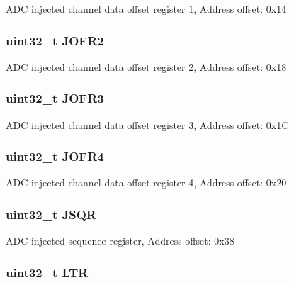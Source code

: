 A\-D\-C injected channel data offset register 1, Address offset\-: 0x14 \hypertarget{struct_a_d_c___type_def_a11e65074b9f06b48c17cdfa5bea9f125}{
\subsubsection[{J\-O\-F\-R2}]{ uint32\-\_\-t J\-O\-F\-R2}}\label{struct_a_d_c___type_def_a11e65074b9f06b48c17cdfa5bea9f125}
A\-D\-C injected channel data offset register 2, Address offset\-: 0x18 \hypertarget{struct_a_d_c___type_def_a613f6b76d20c1a513976b920ecd7f4f8}{
\subsubsection[{J\-O\-F\-R3}]{ uint32\-\_\-t J\-O\-F\-R3}}\label{struct_a_d_c___type_def_a613f6b76d20c1a513976b920ecd7f4f8}
A\-D\-C injected channel data offset register 3, Address offset\-: 0x1\-C \hypertarget{struct_a_d_c___type_def_a2fd59854223e38158b4138ee8e913ab3}{
\subsubsection[{J\-O\-F\-R4}]{ uint32\-\_\-t J\-O\-F\-R4}}\label{struct_a_d_c___type_def_a2fd59854223e38158b4138ee8e913ab3}
A\-D\-C injected channel data offset register 4, Address offset\-: 0x20 \hypertarget{struct_a_d_c___type_def_a75e0cc079831adcc051df456737d3ae4}{
\subsubsection[{J\-S\-Q\-R}]{ uint32\-\_\-t J\-S\-Q\-R}}\label{struct_a_d_c___type_def_a75e0cc079831adcc051df456737d3ae4}
A\-D\-C injected sequence register, Address offset\-: 0x38 \hypertarget{struct_a_d_c___type_def_a9f8712dfef7125c0bb39db11f2b7416b}{
\subsubsection[{L\-T\-R}]{ uint32\-\_\-t L\-T\-R}}\label{struct_a_d_c___type_def_a9f8712dfef7125c0bb39db11f2b7416b}
